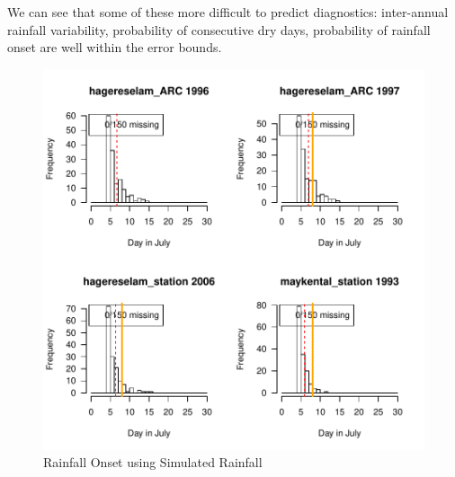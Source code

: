 \documentclass[11pt]{article}
\begin{document}
We can see that some of these more difficult to predict diagnostics: inter-annual rainfall variability, probability of consecutive dry days, probability of rainfall onset are well within the error bounds.


\begin{figure}[htbp]
\caption{Rainfall Onset using Simulated Rainfall}
\begin{center}
\includegraphics[page=3,width=5.0in]{Onset_postpred.pdf}
\end{center}
\end{figure}

\newpage
\end{document}
